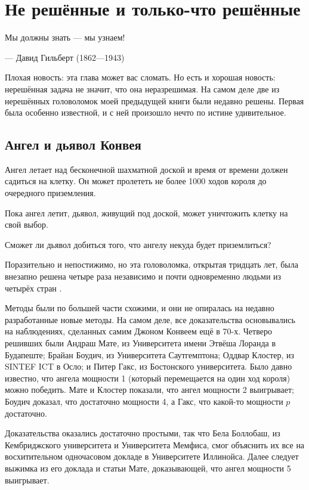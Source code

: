 \chapter{Не решённые и только-что решённые}


\setlength{\epigraphwidth}{.80\textwidth}
\epigraph{Мы должны знать --- мы узнаем!
}{--- Давид Гильберт (1862---1943)}

Плохая новость: эта глава может вас сломать.
Но есть и хорошая новость: нерешённая задача не значит, что она неразрешимая.
На самом деле две из нерешённых головоломок моей предыдущей книги были недавно решены.
Первая была особенно известной, и с ней произошло нечто по истине удивительное.

\section*{Ангел и дьявол Конвея}

Ангел летает над бесконечной шахматной доской и время от времени
должен садиться на клетку.
Он может пролететь не более 1000 ходов
короля до очередного приземления.

Пока ангел летит, дьявол, живущий под доской, может уничтожить клетку на свой выбор.

Сможет ли дьявол добиться того, что ангелу некуда будет приземлиться?

\medskip

Поразительно и непостижимо, но эта головоломка, открытая тридцать лет, была внезапно решена
четыре раза
независимо и почти одновременно
людьми из четырёх стран \cite{10, 20, 40, 43}.

Методы были по большей части схожими, и они не опиралась на недавно разработанные новые методы.
На самом деле, все доказательства основывались на наблюдениях, сделанных самим Джоном Конвеем ещё в 70-х.
Четверо решивших были
Андраш Мате, из Университета имени Этвёша Лоранда в Будапеште;
Брайан Боудич, из Университета Саутгемптона;
Оддвар Клостер, из SINTEF ICT в Осло; и Питер Гакс, из Бостонского университета.
Было давно известно, что ангела мощности 1 (который перемещается на один ход короля) можно победить.
Мате и Клостер показали, что ангел мощности 2 выигрывает;
Боудич доказал, что достаточно мощности 4,
а Гакс, что какой-то мощности $p$ достаточно.

Доказательства оказались достаточно простыми, так что Бела Боллобаш, из Кембриджского университета и Университета Мемфиса, смог объяснить их все на восхитительном одночасовом докладе в Университете Иллинойса.
Далее следует выжимка из его доклада и статьи Мате, доказывающей, что ангел мощности 5 выигрывает.

